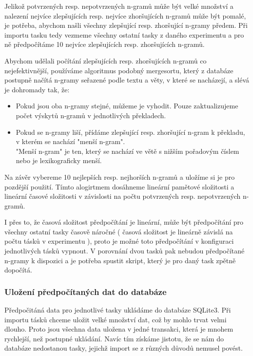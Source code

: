 Jelikož potvrzených resp. nepotvrzených n-gramů může být velké množství
  a nalezení nejvíce zlepšujících resp. nejvíce zhoršujících n-gramů může být pomalé,
  je potřeba,
  abychom našli všechny zlepšující resp. zhoršující n-gramy předem.
Při importu tasku tedy vezmeme všechny ostatní tasky z daného experimentu
  a pro ně předpočítáme 10 nejvíce zlepšujících resp. zhoršujících n-gramů. 

Abychom udělali počítání zlepšujících resp. zhoršujících n-gramů co nejefektivnější,
  používáme algoritmus podobný mergesortu,
  který z databáze postupně načítá n-gramy seřazené podle textu a věty, v které se nacházejí, 
  a slévá je dohromady tak, že:

\begin{itemize}
  \item Pokud jsou oba n-gramy stejné, můžeme je vyhodit.
    Pouze zaktualizujeme počet výskytů n-gramů v jednotlivých překladech. 
  \item Pokud se n-gramy liší, přídáme zlepšující resp. zhoršující n-gram k překladu,
    v kterém se nachází "menší n-gram". \\
    "Menší n-gram" je ten, který se nachází ve větě s nižším pořadovým číslem
    nebo je lexikograficky menší.
\end{itemize}

Na závěr vybereme 10 nejlepších resp. nejhorších n-gramů
  a uložíme si je pro pozdější použití.
Tímto alogirtmem dosáhneme lineární pamětové složitosti a
  lineární časové složitosti v závislosti na počtu potvrzených resp. nepotvrzených n-gramů.

I přes to, že časová složitost předpočítání je lineární,
  může být předpočítání pro všechny ostatní tasky časově náročné
  ( časová složitost je lineárně závislá na počtu tásků v experimentu ),
  proto je možné toto předpočítání v konfiguraci jednotlivých tásků vypnout.
V porovnání dvou tasků pak nebudou předpočítané n-gramy k dispozici
  a je potřeba spustit skript,
  který je pro daný task zpětně dopočítá.

\subsubsection{Uložení předpočítaných dat do databáze}
Předpočitáná data pro jednotlivé tasky ukládáme do databáze SQLite3.
Při importu tásků chceme uložit velké množství dat,
  což by mohlo trvat velmi dlouho.
Proto jsou všechna data uložena v jedné transakci,
  která je mnohem rychlejší,
  než postupné ukládání.
Navíc tím získáme jistotu,
  že se nám do databáze nedostanou tasky,
  jejichž import se z různých důvodů nemusel povést.
 
